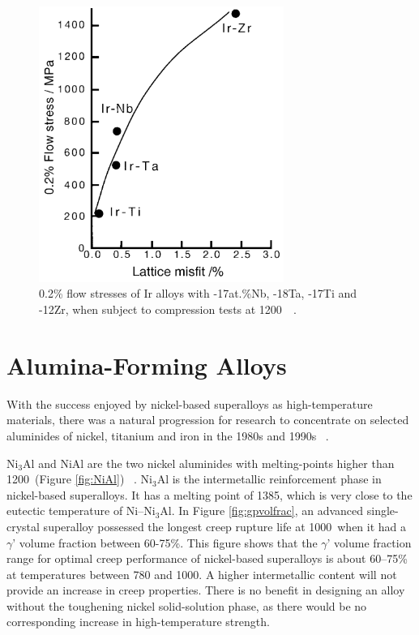 \begin{figure}[H]
\begin{center}
\includegraphics[width=8cm]{irflowstress}
\caption{0.2\% flow stresses of Ir alloys with -17at.\%Nb, -18Ta, -17Ti and -12Zr, when subject to compression tests at 1200\celsius\ ~\cite{mitarai99}.}
\label{fig:ir17nbi}
\end{center}
\end{figure}
%
\clearpage
\section{Alumina-Forming Alloys}

With the success enjoyed by nickel-based superalloys as high-temperature materials, there was a natural progression for research to concentrate on selected aluminides of nickel, titanium and iron in the 1980s and 1990s ~\cite{cotton93, miracle94a, walston93, white89, nathal92}.  

Ni$_3$Al and NiAl are the two nickel aluminides with melting-points higher than 1200\celsius\ (Figure \ref{fig:NiAl}) ~\cite{okamoto93}.  Ni$_3$Al is the intermetallic reinforcement phase in nickel-based superalloys.  It has a melting point of 1385\celsius, which is very close to the eutectic temperature of Ni--Ni$_3$Al.  In Figure \ref{fig:gpvolfrac}, an advanced single-crystal superalloy possessed the longest creep rupture life at 1000\celsius\ when it had a $\gamma$' volume fraction between 60-75\%.  This figure shows that the $\gamma$' volume fraction range for optimal creep performance of nickel-based superalloys is about 60--75\%  at temperatures between 780 and 1000\celsius.  A higher intermetallic content will not provide an increase in creep properties.  There is no benefit in designing an alloy without the toughening nickel solid-solution phase, as there would be no corresponding increase in high-temperature strength.

